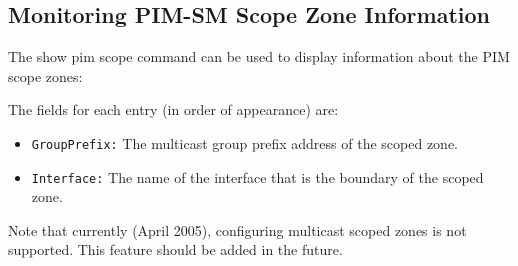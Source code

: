 \subsection{Monitoring PIM-SM Scope Zone Information}

The {\stt show pim scope} command can be used to display
information about the PIM scope zones:

\vspace{0.1in}
\noindent{}
\vspace{0.1in}

The fields for each entry (in order of appearance) are:
\begin{itemize}

  \item {\tt GroupPrefix:} The multicast group prefix address of the scoped
  zone.

  \item {\tt Interface:} The name of the interface that is the boundary
  of the scoped zone.

\end{itemize}

Note that currently (April 2005), configuring multicast scoped zones is not
supported. This feature should be added in the future.
